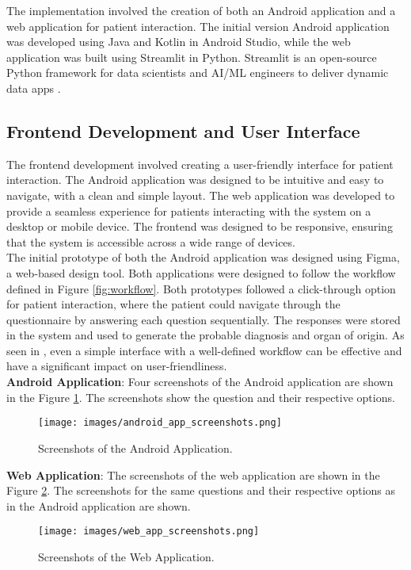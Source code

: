 \noindent The implementation involved the creation of both an Android application and a web application for patient interaction. The initial version Android application was developed using Java and Kotlin in Android Studio, while the web application was built using Streamlit in Python. Streamlit is an open-source Python framework for data scientists and AI/ML engineers to deliver dynamic data apps \cite{streamlit}. 

\subsection{Frontend Development and User Interface}
The frontend development involved creating a user-friendly interface for patient interaction. The Android application was designed to be intuitive and easy to navigate, with a clean and simple layout. The web application was developed to provide a seamless experience for patients interacting with the system on a desktop or mobile device. The frontend was designed to be responsive, ensuring that the system is accessible across a wide range of devices.\\

\noindent The initial prototype of both the Android application was designed using Figma, a web-based design tool. Both applications were designed to follow the workflow defined in Figure \ref{fig:workflow}. Both prototypes followed a click-through option for patient interaction, where the patient could navigate through the questionnaire by answering each question sequentially. The responses were stored in the system and used to generate the probable diagnosis and organ of origin. As seen in \cite{eich1999internet}, even a simple interface with a well-defined workflow can be effective and have a significant impact on user-friendliness.\\

\noindent \textcolor{TUMRed}{\textbf{Android Application}}: Four screenshots of the Android application are shown in the Figure \ref{fig:android_app_screenshots}. The screenshots show the question and their respective options.
\begin{figure}[H]
    \centering
    \texttt{[image: images/android\_app\_screenshots.png]}
    \caption{Screenshots of the Android Application.}
    \label{fig:android_app_screenshots}
\end{figure}

\noindent \textcolor{TUMRed}{\textbf{Web Application}}: The screenshots of the web application are shown in the Figure \ref{fig:web_app_screenshots}. The screenshots for the same questions and their respective options as in the Android application are shown.
\begin{figure}[H]
    \centering
    \texttt{[image: images/web\_app\_screenshots.png]}
    \caption{Screenshots of the Web Application.}
    \label{fig:web_app_screenshots}
\end{figure}

